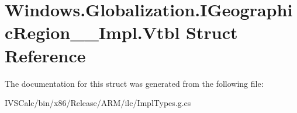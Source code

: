 \hypertarget{struct_windows_1_1_globalization_1_1_i_geographic_region_____impl_1_1_vtbl}{}\section{Windows.\+Globalization.\+I\+Geographic\+Region\+\_\+\+\_\+\+Impl.\+Vtbl Struct Reference}
\label{struct_windows_1_1_globalization_1_1_i_geographic_region_____impl_1_1_vtbl}


The documentation for this struct was generated from the following file\+:\begin{DoxyCompactItemize}
\item 
I\+V\+S\+Calc/bin/x86/\+Release/\+A\+R\+M/ilc/Impl\+Types.\+g.\+cs\end{DoxyCompactItemize}

